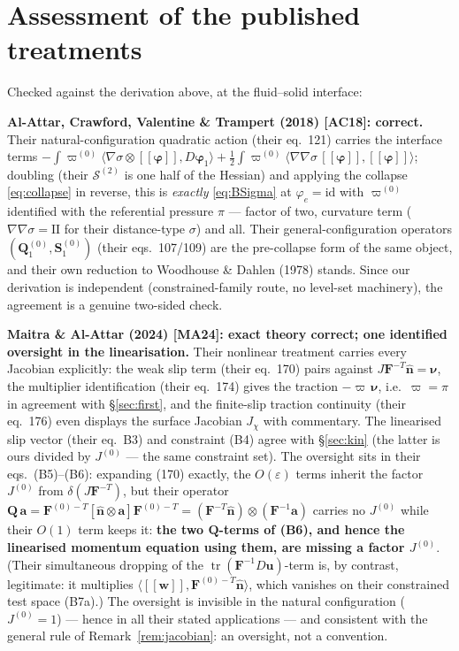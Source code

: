\documentclass[11pt]{article}
\newcommand{\eps}{\varepsilon}
\newcommand{\bnu}{\bm{\nu}}
\newcommand{\jump}[1]{[\![#1]\!]}
\newcommand{\tr}{\operatorname{tr}}
\begin{document}
\appendix

\section{Assessment of the published treatments}
\label{sec:verdict}

Checked against the derivation above, at the fluid--solid interface:

\textbf{Al-Attar, Crawford, Valentine \& Trampert (2018)
\cite{AC18} [AC18]: correct.} Their natural-configuration quadratic action (their eq.~121)
carries the interface terms
$-\!\int\varpi^{(0)}\langle\nabla\sigma\otimes\jump{\bm{\varphi}},
D\bm{\varphi}_1\rangle + \tfrac12\!\int\varpi^{(0)}\langle
\nabla\nabla\sigma\,\jump{\bm{\varphi}}, \jump{\bm{\varphi}}\rangle$;
doubling (their $\mathcal{S}^{(2)}$ is one half of the Hessian) and
applying the collapse \eqref{eq:collapse} in reverse, this is
\emph{exactly} \eqref{eq:BSigma} at $\varphi_e = \mathrm{id}$ with
$\varpi^{(0)}$ identified with the referential pressure $\pi$ ---
factor of two, curvature term ($\nabla\nabla\sigma = \mathrm{II}$ for
their distance-type $\sigma$) and all. Their general-configuration
operators $(\mathbf{Q}_1^{(0)}, \mathbf{S}_1^{(0)})$ (their
eqs.~107/109) are the pre-collapse form of the same object, and their
own reduction to Woodhouse \& Dahlen (1978) \cite{WoodhouseDahlen1978}
stands. Since our
derivation is independent (constrained-family route, no level-set
machinery), the agreement is a genuine two-sided check.

\textbf{Maitra \& Al-Attar (2024) \cite{MA24} [MA24]: exact theory
correct;
one identified oversight in the linearisation.} Their nonlinear
treatment carries every Jacobian explicitly: the weak slip term (their
eq.~170) pairs against $J\mathbf{F}^{-T}\hat{\mathbf{n}} = \bnu$, the
multiplier identification (their eq.~174) gives the traction
$-\varpi\,\bnu$, i.e.\ $\varpi = \pi$ in agreement with
\S\ref{sec:first}, and the finite-slip traction continuity (their
eq.~176) even displays the surface Jacobian $J_\chi$ with commentary.
The linearised slip vector (their eq.~B3) and constraint (B4) agree
with \S\ref{sec:kin} (the latter is ours divided by $J^{(0)}$ --- the
same constraint set). The oversight sits in their eqs.~(B5)--(B6):
expanding (170) exactly, the $O(\eps)$ terms inherit the factor
$J^{(0)}$ from $\delta(J\mathbf{F}^{-T})$, but their operator
$\mathbf{Q}\,\mathbf{a} = \mathbf{F}^{(0)-T}[\hat{\mathbf{n}}\otimes
\mathbf{a}]\mathbf{F}^{(0)-T} = (\mathbf{F}^{-T}\hat{\mathbf{n}})
\otimes(\mathbf{F}^{-1}\mathbf{a})$ carries no $J^{(0)}$ while their
$O(1)$ term keeps it: \textbf{the two $\mathbf{Q}$-terms of (B6), and
hence the linearised momentum equation using them, are missing a
factor $J^{(0)}$}. (Their simultaneous dropping of the
$\tr(\mathbf{F}^{-1}D\mathbf{u})$-term is, by contrast, legitimate:
it multiplies $\langle\jump{\mathbf{w}},
\mathbf{F}^{(0)-T}\hat{\mathbf{n}}\rangle$, which vanishes on their
constrained test space (B7a).) The oversight is invisible in the
natural configuration ($J^{(0)} = 1$) --- hence in all their stated
applications --- and consistent with the general rule of
Remark~\ref{rem:jacobian}: an oversight, not a convention.
\end{document}

